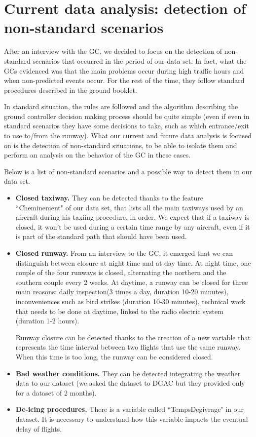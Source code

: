 \documentclass{article}
\begin{document}
\section{Current data analysis: detection of non-standard scenarios}\label{non-standard}
After an interview with the GC, we decided to focus on the detection of non-standard scenarios that occurred in the period of our data set.
In fact, what the GCs evidenced was that the main problems occur during high traffic hours and when non-predicted events occur. For the rest of the time, they follow standard procedures described in the ground booklet\cite{livret}.

In standard situation, the rules are followed and the algorithm describing the ground controller decision making process should be quite simple (even if even in standard scenarios they have some decisions to take, such as which entrance/exit to use to/from the runway).
What our current and future data analysis is focused on is the detection of non-standard situations, to be able to isolate them and perform an analysis on the behavior of the GC in these cases.

Below is a list of non-standard scenarios and a possible way to detect them in our data set.
\begin{itemize}
	\item \textbf{Closed taxiway.} They can be detected thanks to the feature ``Cheminement" of our data set, that lists all the main taxiways used by an aircraft during his taxiing procedure, in order. We expect that if a taxiway is closed, it won't be used during a certain time range by any aircraft, even if it is part of the standard path that should have been used.
	\item \textbf{Closed runway.} From an interview to the GC, it emerged that we can distinguish between closure at night time and at day time. At night time, one couple of the four runways is closed, alternating the northern and the southern couple every 2 weeks. At daytime, a runway can be closed for three main reasons: daily inspection(3 times a day, duration 10-20 minutes), inconveniences such as bird strikes (duration 10-30 minutes), technical work that needs to be done at daytime, linked to the radio electric system (duration 1-2 hours).
	
	Runway closure can be detected thanks to the creation of a new variable that represents the time interval between two flights that use the same runway. When this time is too long, the runway can be considered closed.
	\item \textbf{Bad weather conditions.} They can be detected integrating the weather data to our dataset (we asked the dataset to DGAC but they provided only for a dataset of 2 months).
	\item \textbf{De-icing procedures.} There is a variable called ``TempsDegivrage" in our dataset. It is necessary to understand how this variable impacts the eventual delay of flights.
\end{itemize}
\end{document}
